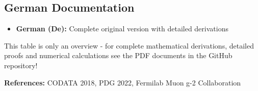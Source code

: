 \documentclass[12pt,a4paper]{article}
\begin{document}
	\subsection{German Documentation}
	
	\begin{itemize}
		\item \textbf{German (De):} Complete original version with detailed derivations
	\end{itemize}
	
	This table is only an overview - for complete mathematical derivations, detailed proofs and numerical calculations see the PDF documents in the GitHub repository!
	
	\textbf{References:} CODATA 2018, PDG 2022, Fermilab Muon g-2 Collaboration
	
\end{document}
